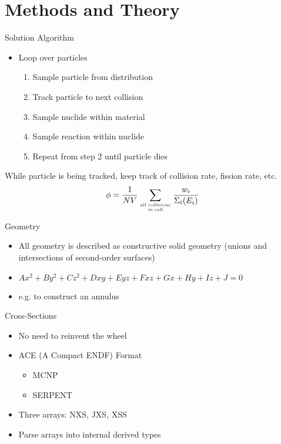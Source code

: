 \documentclass{beamer}
\begin{document}
\section{Methods and Theory}

\begin{frame}{Solution Algorithm}
  \begin{itemize}
  \item<1-> Loop over particles
    \begin{enumerate}
    \item<1-> Sample particle from distribution
    \item<1-> Track particle to next collision
    \item<1-> Sample nuclide within material
    \item<1-> Sample reaction within nuclide
    \item<1-> Repeat from step 2 until particle dies
    \end{enumerate}
  \end{itemize}

  While particle is being tracked, keep track of collision rate, fission rate,
  etc.
  \begin{equation*}
    \phi = \frac{1}{NV} \sum\limits_{\text{all collisions} \atop \text{in cell}} \frac{w_i}{\Sigma_t (E_i)}
  \end{equation*}

\end{frame}

\begin{frame}{Geometry}
  \begin{itemize}
  \item<1-> All geometry is described as constructive solid geometry (unions and
    intersections of second-order surfaces)
  \item<1-> $Ax^2 + By^2 + Cz^2 + Dxy + Eyz + Fxz + Gx + Hy + Iz + J = 0$
  \item<1-> e.g. to construct an annulus
  \end{itemize}
  
\end{frame}

\begin{frame}{Cross-Sections}
  \begin{itemize}
  \item<1-> No need to reinvent the wheel
  \item<1-> ACE (A Compact ENDF) Format
    \begin{itemize}
    \item<1-> MCNP
    \item<1-> SERPENT
    \end{itemize}
  \item<1-> Three arrays: NXS, JXS, XSS
  \item<1-> Parse arrays into internal derived types
  \end{itemize}
\end{frame}
\end{document}
